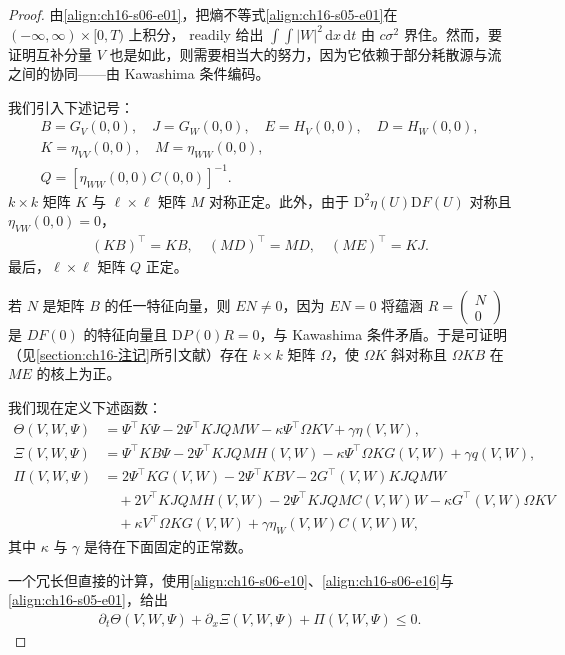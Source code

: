\documentclass[../../main.tex]{subfiles}
\begin{document}
\begin{proof}
由\eqref{align:ch16-s06-e01}，把熵不等式\eqref{align:ch16-s05-e01}在 $(-\infty,\infty)\times[0,T)$ 上积分， readily 给出 $\int\int|W|^2\,\mathrm{d}x\,\mathrm{d}t$ 由 $c\sigma^2$ 界住。然而，要证明互补分量 $V$ 也是如此，则需要相当大的努力，因为它依赖于部分耗散源与流之间的协同——由 Kawashima 条件编码。

我们引入下述记号：
\begin{align}
B=G_V(0,0),\quad J=G_W(0,0),\quad E=H_V(0,0),\quad D=H_W(0,0),
\label{align:ch16-s06-e021}\\
K=\eta_{VV}(0,0),\quad M=\eta_{WW}(0,0),
\label{align:ch16-s06-e022}\\
Q=[\eta_{WW}(0,0)C(0,0)]^{-1}.
\label{align:ch16-s06-e023}
\end{align}
$k\times k$ 矩阵 $K$ 与 $\ell\times\ell$ 矩阵 $M$ 对称正定。此外，由于 $\mathrm{D}^2\eta(U)\mathrm{D}F(U)$ 对称且 $\eta_{VW}(0,0)=0$，
\begin{align}
(KB)^\top=KB,\quad(MD)^\top=MD,\quad(ME)^\top=KJ.
\label{align:ch16-s06-e024}
\end{align}
最后，$\ell\times\ell$ 矩阵 $Q$ 正定。

若 $N$ 是矩阵 $B$ 的任一特征向量，则 $EN\neq0$，因为 $EN=0$ 将蕴涵 $R=\begin{pmatrix}N\\0\end{pmatrix}$ 是 $DF(0)$ 的特征向量且 $\mathrm{D}P(0)R=0$，与 Kawashima 条件矛盾。于是可证明（见\cref{section:ch16-注记}所引文献）存在 $k\times k$ 矩阵 $\Omega$，使 $\Omega K$ 斜对称且 $\Omega KB$ 在 $ME$ 的核上为正。

我们现在定义下述函数：
\begin{align}
\Theta(V,W,\Psi)&=\Psi^\top K\Psi-2\Psi^\top KJQMW-\kappa\Psi^\top\Omega KV+\gamma\eta(V,W),
\label{align:ch16-s06-e025}\\
\Xi(V,W,\Psi)&=\Psi^\top KB\Psi-2\Psi^\top KJQMH(V,W)-\kappa\Psi^\top\Omega KG(V,W)+\gamma q(V,W),
\label{align:ch16-s06-e026}\\
\Pi(V,W,\Psi)&=2\Psi^\top KG(V,W)-2\Psi^\top KBV-2G^\top(V,W)KJQMW\nonumber\\
&\quad+2V^\top KJQMH(V,W)-2\Psi^\top KJQMC(V,W)W-\kappa G^\top(V,W)\Omega KV\nonumber\\
&\quad+\kappa V^\top\Omega KG(V,W)+\gamma\eta_W(V,W)C(V,W)W,
\label{align:ch16-s06-e027}
\end{align}
其中 $\kappa$ 与 $\gamma$ 是待在下面固定的正常数。

一个冗长但直接的计算，使用\eqref{align:ch16-s06-e10}、\eqref{align:ch16-s06-e16}与\eqref{align:ch16-s05-e01}，给出
\begin{align}
\partial_t\Theta(V,W,\Psi)+\partial_x\Xi(V,W,\Psi)+\Pi(V,W,\Psi)\leqslant0.
\label{align:ch16-s06-e028}
\end{align}


\end{proof}
\end{document}
